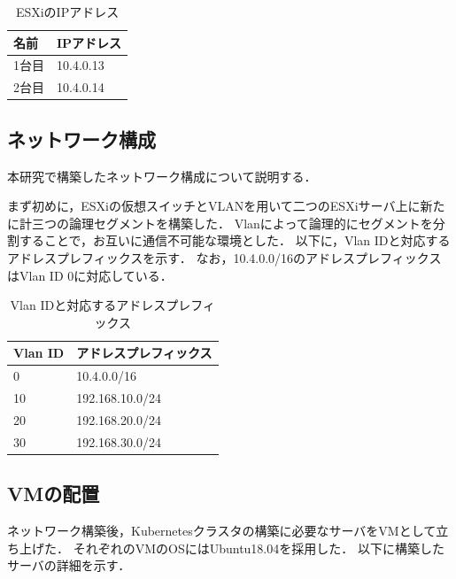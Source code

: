 \begin{table}[htb]
  \begin{center}
    \caption{ESXiのIPアドレス}
    \begin{tabular}{|l|l|} \hline
      名前 & IPアドレス \\ \hline
      1台目 & 10.4.0.13 \\ \hline
      2台目 & 10.4.0.14 \\ \hline
    \end{tabular}
  \end{center}
\end{table}

\subsection{ネットワーク構成}
\label{implementation:network-environment}

本研究で構築したネットワーク構成について説明する．

まず初めに，ESXiの仮想スイッチとVLANを用いて二つのESXiサーバ上に新たに計三つの論理セグメントを構築した．
Vlanによって論理的にセグメントを分割することで，お互いに通信不可能な環境とした．
以下に，Vlan IDと対応するアドレスプレフィックスを示す．
なお，10.4.0.0/16のアドレスプレフィックスはVlan ID 0に対応している．

\begin{table}[htb]
  \begin{center}
    \caption{Vlan IDと対応するアドレスプレフィックス}
    \begin{tabular}{|l|l|} \hline
      Vlan ID & アドレスプレフィックス \\ \hline
      0 & 10.4.0.0/16 \\ \hline
      10 & 192.168.10.0/24 \\ \hline
      20 & 192.168.20.0/24 \\ \hline
      30 & 192.168.30.0/24 \\ \hline
    \end{tabular}
  \end{center}
\end{table}

\subsection{VMの配置}

ネットワーク構築後，Kubernetesクラスタの構築に必要なサーバをVMとして立ち上げた．
それぞれのVMのOSにはUbuntu18.04を採用した．
以下に構築したサーバの詳細を示す．

